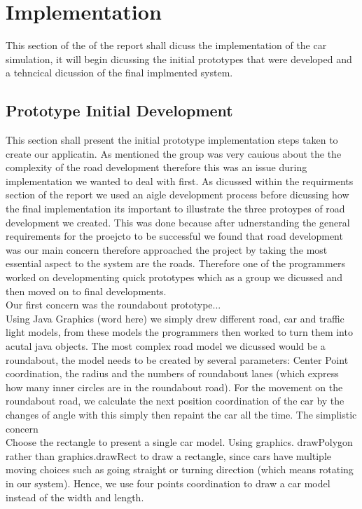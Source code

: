 \documentclass[11pt]{article}
\begin{document}
	\section{Implementation} %
This section of the of the report shall dicuss the implementation of the car simulation, it will begin dicussing the initial prototypes that were developed and a tehncical dicussion of the final implmented system. 
	\subsection{Prototype Initial Development}
This section shall present the initial prototype implementation steps taken to create our applicatin. As mentioned the group was very cauious about the the complexity of the road development therefore this was an issue during implementation we wanted to deal with first.  
As dicussed within the requirments section of the report we used an aigle development process before dicussing how the final implementation its important to illustrate the three protoypes of road development we created. This was done because after udnerstanding the general requirements for the proejcto to be successful we found that road development was our main concern therefore approached the project by taking the most essential aspect to the system are the roads. Therefore one of the programmers worked on developmenting quick prototypes which as a group we dicussed and then moved on to final developments.\\
Our first concern was the roundabout prototype...\\
Using Java Graphics (word here) we simply drew different road, car and traffic light models, from these models the programmers then worked to turn them into acutal java objects. 
The most complex road model we dicussed would be a roundabout, the model needs to be created by several parameters: Center Point coordination, the radius and the numbers of roundabout lanes (which express how many inner circles are in the roundabout road). For the movement on the roundabout road, we calculate the next position coordination of the car by the changes of angle with this simply then repaint the car all the time.
The simplistic concern \\
Choose the rectangle to present a single car model. Using graphics. drawPolygon rather than graphics.drawRect to draw a rectangle, since cars have multiple moving choices such as going straight or turning direction (which means rotating in our system). Hence, we use four points coordination to draw a car model instead of the width and length.
\end{document}
